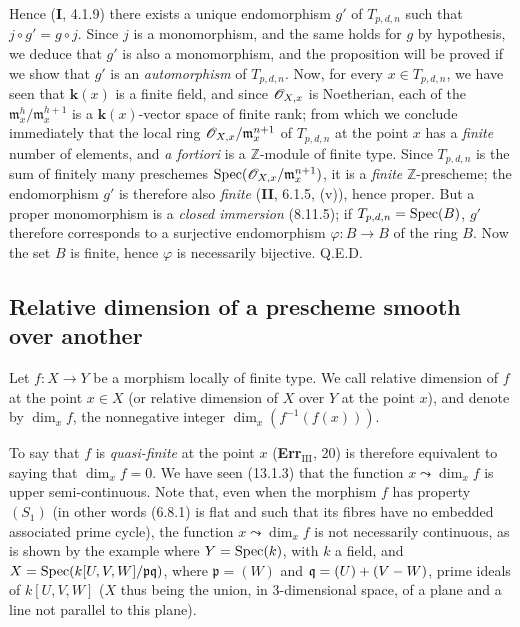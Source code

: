 Hence (\textbf{I}, 4.1.9) there exists a unique endomorphism $g'$ of $T_{p,d,n}$ such that $j\circ g'=g\circ j$. Since $j$ is a monomorphism, and the same holds for $g$ by hypothesis, we deduce that $g'$ is also a monomorphism, and the proposition will be proved if we show that $g'$ is an \emph{automorphism} of $T_{p,d,n}$. Now, for every $x\in T_{p,d,n}$, we have seen that $\boldsymbol{k}(x)$ is a finite field, and since $\mathscr{O}_{X,x}$ is Noetherian, each of the $\mathfrak m_x^h/\mathfrak m_x^{h+1}$ is a $\boldsymbol{k}(x)$-vector space of finite rank; from which we conclude immediately that the local ring $\mathscr{O}_{X,x}/\mathfrak m_x^{n+1}$ of $T_{p,d,n}$ at the point $x$ has a \emph{finite} number of elements, and \emph{a fortiori} is a $\mathbb{Z}$-module of finite type. Since $T_{p,d,n}$ is the sum of finitely many preschemes $\operatorname{Spec}(\mathscr{O}_{X,x}/\mathfrak m_x^{n+1})$, it is a \emph{finite} $\mathbb{Z}$-prescheme; the endomorphism $g'$ is therefore also \emph{finite} (\textbf{II}, 6.1.5, (v)), hence proper. But a proper monomorphism is a \emph{closed immersion} (8.11.5); if $T_{p,d,n}=\operatorname{Spec}(B)$, $g'$ therefore corresponds to a surjective endomorphism $\varphi:B\to B$ of the ring $B$. Now the set $B$ is finite, hence $\varphi$ is necessarily bijective. Q.E.D.

\subsection{Relative dimension of a prescheme smooth over another}

\begin{definition}[17.10.1]\label{IV.17.10.1}
Let $f:X\to Y$ be a morphism locally of finite type. We call relative dimension of $f$ at the point $x\in X$ (or relative dimension of $X$ over $Y$ at the point $x$), and denote by $\dim_x f$, the nonnegative integer $\dim_x(f^{-1}(f(x)))$.
\end{definition}

To say that $f$ is \emph{quasi-finite} at the point $x$ (\textbf{Err}$_{\mathrm{III}}$, 20) is therefore equivalent to saying that $\dim_x f=0$. We have seen (13.1.3) that the function $x\leadsto\dim_x f$ is upper semi-continuous. Note that, even when the morphism $f$ has property $(S_1)$ (in other words (6.8.1) is flat and such that its fibres have no embedded associated prime cycle), the function $x\leadsto\dim_x f$ is not necessarily continuous, as is shown by the example where $Y=\operatorname{Spec}(k)$, with $k$ a field, and $X=\operatorname{Spec}(k[U,V,W]/\mathfrak p\mathfrak q)$, where $\mathfrak p=(W)$ and $\mathfrak q=(U)+(V- W)$, prime ideals of $k[U,V,W]$ ($X$ thus being the union, in 3-dimensional space, of a plane and a line not parallel to this plane).

